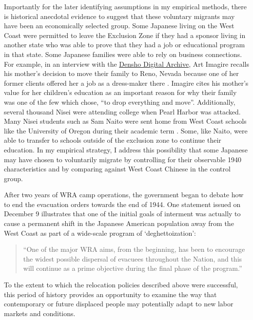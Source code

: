 Importantly for the later identifying assumptions in my empirical methods,
there is historical anecdotal evidence to suggest that these
voluntary migrants may have been an economically selected group.
Some Japanese living on the West Coast were permitted to leave the Exclusion Zone
if they had a sponsor living in another state who was able to prove that
they had a job or educational program in that state.
Some Japanese families were able to rely on business connections.
For example, in an interview with the 
\href{https://ddr.densho.org/media/ddr-manz-1/ddr-manz-1-34-transcript-2e0e58d5a9.htm}{Densho Digital Archive},
Art Imagire recalls his mother's decision to move their family to Reno, Nevada 
because one of her former clients offered her a job as a dress-maker there 
\citep{imagireArtImagireInterview2008}.
Imagire cites his mother's value for her children's education
as an important reason for why their family was one of the few which chose,
``to drop everything and move''.
Additionally, several thousand Nisei were attending college 
when Pearl Harbor was attacked.
Many Nisei students such as Sam Naito 
were sent home from West Coast schools like the University of Oregon
during their academic term \citep{naitoSamNaitoInterview2003}.
Some, like Naito, were able to transfer to schools outside of the exclusion
zone to continue their education.
In my empirical strategy, I address this possibility that
some Japanese may have chosen to voluntarily migrate
by controlling for their observable 1940 characteristics
and by comparing against West Coast Chinese in the control group.

After two years of WRA camp operations, the government began to debate how to
end the evacuation orders towards the end of 1944. One statement issued on
December 9 illustrates that one of the initial goals of interment was actually
to cause a permanent shift in the Japanese American population away from the
West Coast as part of a wide-scale program of `deghettoization':
\begin{quote}
  ``One of the major WRA aims, from the beginning, has been to encourage the widest possible dispersal of evacuees throughout the Nation, and this will continue as a prime objective during the final phase of the program.''
  \hfill {}
\end{quote}

To the extent to which the relocation policies described above were successful,
this period of history provides an opportunity to examine
the way that contemporary or future displaced people
may potentially adapt to new labor markets and conditions.

